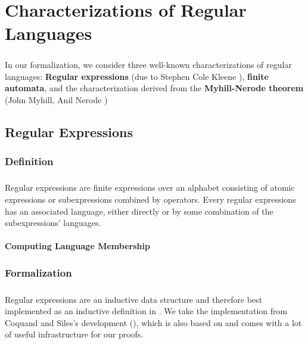 \documentclass[11pt,a4paper,oneside]{book}
\begin{document}
    \chapter{Characterizations of Regular Languages}
        
        \paragraph{} In our formalization, we consider three well-known characterizations of regular languages: \textbf{Regular expressions} (due to Stephen Cole Kleene \cite{KleeneNets}), \textbf{finite automata}, and the characterization derived from the \textbf{Myhill-Nerode theorem} (John Myhill, Anil Nerode \cite{Nerode1958}) 
    
        \section{Regular Expressions}

            \subsection{Definition}

                \paragraph{} Regular expressions are finite expressions over an alphabet consisting of atomic expressions or subexpressions combined by operators. Every regular expressions has an associated language, either directly or by some combination of the subexpressions' languages.

                \subsubsection{Computing Language Membership}

                    \paragraph{}


            \subsection{Formalization}
            
                \paragraph{} Regular expressions are an inductive data structure and therefore best implemented as an inductive definition in \coq. We take the implementation from Coquand and Siles's development (\cite{DBLP:conf/cpp/CoquandS11}), which is also based on \ssreflect and comes with a lot of useful infrastructure for our proofs.
\end{document}
